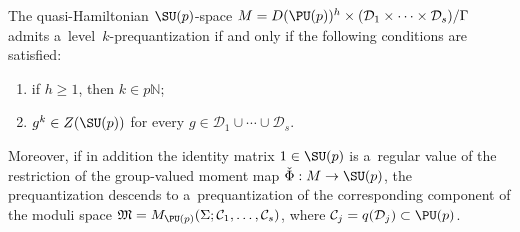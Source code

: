 \begin{Theorem}
\label{thm:obs}
The quasi-Hamiltonian $\SU(p)$-space $M=D(\PU(p))^h \times (\mathcal{D}_1 \times \dots \times
\mathcal{D}_s)/{\Gamma} $ admits a~level~$k$-prequantization if and only if the following conditions are
satisfied:
\begin{enumerate}\itemsep=0pt
\item[$i)$]
\label{thm:obs-double}
if $h\geq 1$, then $k \in p{\mathbb{N}}$;
\item[$ii)$]
\label{thm:obs-conj}
$g^k \in Z(\SU(p))$ for every $\displaystyle g \in \mathcal{D}_1 \cup \cdots \cup \mathcal{D}_s$.
\end{enumerate}
Moreover, if in addition the identity matrix $1 \in \SU(p)$ is a~regular value of the restriction of the group-valued
moment map $\check{\Phi}:M\to \SU(p)$, the prequantization descends to a~prequantization of the corresponding component
of the moduli space $\mathfrak{M}=M_{\PU(p)}(\Sigma; \mathcal{C}_1, \ldots, \mathcal{C}_s)$, where
$\mathcal{C}_j=q(\mathcal{D}_j) \subset \PU(p)$.
\end{Theorem}
